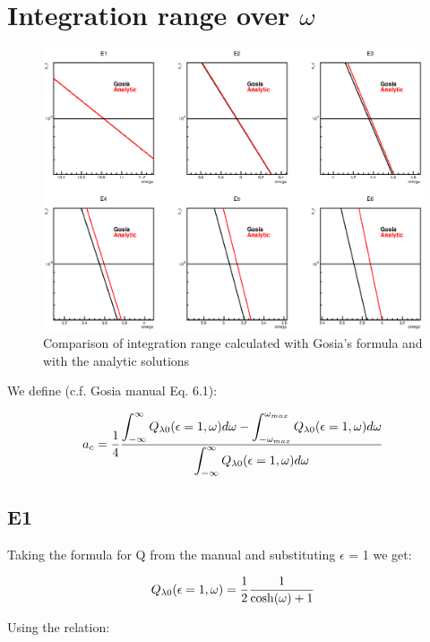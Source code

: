 \section{Integration range over $\omega$}

\begin{figure}[ht!]
\includegraphics[width=\textwidth]{integration_range.eps}
\caption{Comparison of integration range calculated with Gosia's
formula and with the analytic solutions}
\end{figure}

\noindent We define (c.f. Gosia manual Eq. 6.1):

\begin{equation}
a_c = {1 \over 4} {
\displaystyle \int_{-\infty}^\infty Q_{\lambda 0}(\epsilon = 1, \omega) d\omega
- \displaystyle \int_{-\omega_{max}}^{\omega_{max}} Q_{\lambda 0}(\epsilon = 1, \omega) d\omega
\over
\displaystyle \int_{-\infty}^\infty Q_{\lambda 0}(\epsilon = 1, \omega) d\omega
}
\end{equation}

\subsection{E1}

\noindent Taking the formula for Q from the manual and substituting
$\epsilon$ = 1 we get:

\begin{equation}
Q_{\lambda 0}(\epsilon = 1, \omega) = {1 \over 2}{1 \over \cosh(\omega)
+ 1}
\end{equation}

\noindent Using the relation:

